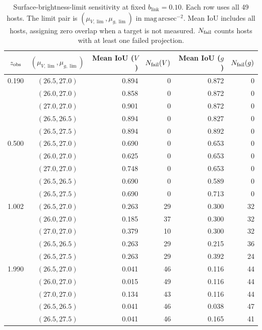 \documentclass[usenatbib]{mnras}
\begin{document}
\begin{table}
\centering
\caption{Surface-brightness-limit sensitivity at fixed
$b_{\mathrm{link}}=0.10$. Each row uses all 49 hosts. The limit pair is
$(\mu_{V,\lim},\mu_{g,\lim})$ in $\mathrm{mag\,arcsec}^{-2}$. Mean IoU
includes all hosts, assigning zero overlap when a target is not measured.
$N_{\rm fail}$ counts hosts with at least one failed projection.}
\label{tab:camelsmultizthreshold}
\small
\setlength{\tabcolsep}{5pt}
\begin{tabular}{ccrrrr}
\toprule
$z_{\rm obs}$ & $(\mu_{V,\lim},\mu_{g,\lim})$ & Mean IoU ($V$) & $N_{\rm fail}(V)$
& Mean IoU ($g$) & $N_{\rm fail}(g)$ \\
\midrule
0.190 & $(26.5,27.0)$ & 0.894 & 0 & 0.872 & 0 \\
      & $(26.0,27.0)$ & 0.858 & 0 & 0.872 & 0 \\
      & $(27.0,27.0)$ & 0.901 & 0 & 0.872 & 0 \\
      & $(26.5,26.5)$ & 0.894 & 0 & 0.827 & 0 \\
      & $(26.5,27.5)$ & 0.894 & 0 & 0.892 & 0 \\
0.500 & $(26.5,27.0)$ & 0.690 & 0 & 0.653 & 0 \\
      & $(26.0,27.0)$ & 0.625 & 0 & 0.653 & 0 \\
      & $(27.0,27.0)$ & 0.748 & 0 & 0.653 & 0 \\
      & $(26.5,26.5)$ & 0.690 & 0 & 0.589 & 0 \\
      & $(26.5,27.5)$ & 0.690 & 0 & 0.713 & 0 \\
1.002 & $(26.5,27.0)$ & 0.263 & 29 & 0.300 & 32 \\
      & $(26.0,27.0)$ & 0.185 & 37 & 0.300 & 32 \\
      & $(27.0,27.0)$ & 0.379 & 10 & 0.300 & 32 \\
      & $(26.5,26.5)$ & 0.263 & 29 & 0.215 & 36 \\
      & $(26.5,27.5)$ & 0.263 & 29 & 0.392 & 24 \\
1.990 & $(26.5,27.0)$ & 0.041 & 46 & 0.116 & 44 \\
      & $(26.0,27.0)$ & 0.015 & 49 & 0.116 & 44 \\
      & $(27.0,27.0)$ & 0.134 & 43 & 0.116 & 44 \\
      & $(26.5,26.5)$ & 0.041 & 46 & 0.038 & 47 \\
      & $(26.5,27.5)$ & 0.041 & 46 & 0.165 & 41 \\
\bottomrule
\end{tabular}
\end{table}
\end{document}
